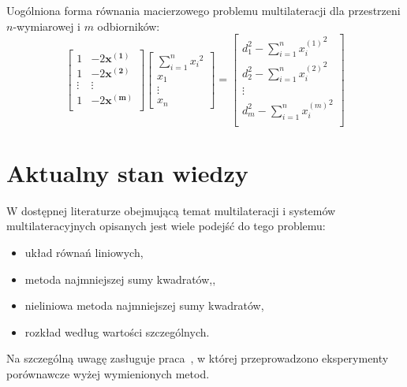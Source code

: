 Uogólniona forma równania macierzowego problemu multilateracji dla przestrzeni $n$-wymiarowej i $m$ odbiorników:
\begin{equation}
    \left[
        \begin{matrix}
            1 & -2\boldsymbol{x^{(1)}}\\
            1 & -2\boldsymbol{x^{(2)}}\\
            \vdots & \vdots\\
            1 & -2\boldsymbol{x^{(m)}}\\
        \end{matrix}
    \right]
    \left[
        \begin{matrix}
            \sum_{i=1}^{n}{x_i}^2\\
            x_1\\
            \vdots\\
            x_n
        \end{matrix}
    \right]
    =
    \left[
        \begin{matrix}
            d_1^2 - \sum_{i=1}^{n}{x_i^{(1)}}^2\\
            d_2^2 - \sum_{i=1}^{n}{x_i^{(2)}}^2\\
            \vdots\\
            d_m^2 - \sum_{i=1}^{n}{x_i^{(m)}}^2\\
        \end{matrix}
    \right]
\end{equation}


\section{Aktualny stan wiedzy}

W dostępnej literaturze obejmującą temat multilateracji i systemów multilateracyjnych opisanych jest wiele podejść do tego problemu:

\begin{itemize}
    \item układ równań liniowych\cite{murphy1995determination},
    \item metoda najmniejszej sumy kwadratów\cite{murphy1995determination},\cite{norrdine2012algebraic},
    \item nieliniowa metoda najmniejszej sumy kwadratów\cite{murphy1995determination},
    \item rozkład według wartości szczególnych\cite{murphy1995determination}.
\end{itemize}
Na szczególną uwagę zasługuje praca~\cite{murphy1995determination}, w której przeprowadzono eksperymenty porównawcze wyżej wymienionych metod.

